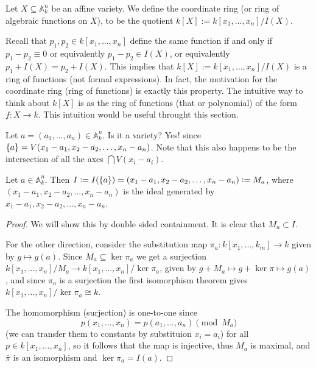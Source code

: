 \documentclass[11pt,a4paper]{article}
\newcommand{\A}{\mathbb A}
\begin{document}
\begin{remark}
  Let $X \subseteq \A_k^n$ be an affine variety.
  We define the coordinate ring (or ring of algebraic functions on $X$),
  to be the quotient $k[X] := k[x_1,\dots,x_n] / I(X)$.
\end{remark}

\begin{remark}
  Recall that $p_1,p_2 \in k[x_1,\dots,x_n]$ define the same function
  if and only if $p_1 - p_2 \equiv 0$ or equivalently $p_1 - p_2 \in I(X)$,
  or equivalently $p_1 + I(X) = p_2 + I(X)$.
  This implies that $k[X] := k[x_1,\dots,x_n] / I(X)$ is a ring of functions
  (not formal expressions).
  In fact, the motivation for the coordinate ring (ring of functions)
  is exactly this property.
  The intuitive way to think about $k[X]$ is as the ring of functions
  (that or polynomial) of the form $f \colon X \to k$.
  This intuition would be useful throught this section.
\end{remark}

\begin{example}
  Let $a = (a_1,\dots,a_n) \in \A_k^n$.
  Is it a variety?
  Yes!
  since $\left\{a\right\} = V(x_1 - a_1,x_2 - a_2,\dots,x_n - a_n)$.
  Note that this also happens to be the intersection of all the axes
  $\bigcap V(x_i - a_i)$.
\end{example}

\begin{proposition}
  \label{prop:point-ideal}
  Let $a \in \A_k^n$.
  Then $I := I(\left\{a\right\}) = (x_1 - a_1,x_2 - a_2,\dots,x_n - a_n) := M_a$,
  where $(x_1 - a_1,x_2 - a_2,\dots,x_n - a_n)$ is the ideal generated
  by $x_1 - a_1,x_2 - a_2,\dots,x_n - a_n$.
\end{proposition}
\begin{proof}
  We will show this by double sided containment.
  It is clear that $M_a \subset I$.

  For the other direction,
  consider the substitution map $\pi_a \colon k[x_1,\dots,k_m] \to k$
  given by $g \mapsto g(a)$.
  Since $M_a \subseteq \ker \pi_a$
  we get a surjection $k[x_1,\dots,x_n]/M_a \to k[x_1,\dots,x_n]/\ker \pi_a$,
  given by $g + M_a \mapsto g + \ker \pi \mapsto g(a)$,
  and since $\pi_a$ is a surjection the first isomorphism theorem
  gives $k[x_1,\dots,x_n]/\ker \pi_a \cong k$.

  The homomorphism (surjection) is one-to-one since
  \[
    p(x_1,\dots,x_n) = p(a_1,\dots,a_n) \pmod{M_a}
  \]
  (we can transfer them to constants by substituion $x_i = a_i$)
  for all $p \in k[x_1,\dots,x_n]$, so it follows that the map is injective,
  thus $M_a$ is maximal,
  and $\bar \pi$ is an isomorphism and $\ker \pi_a = I(a)$.
\end{proof}
\end{document}

